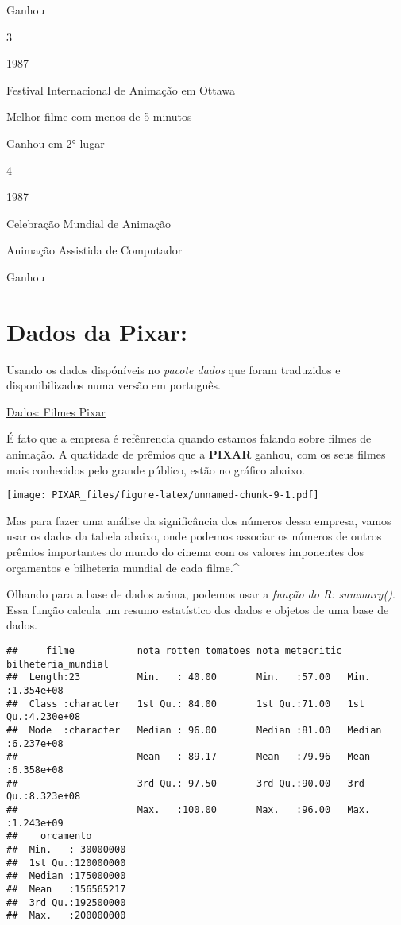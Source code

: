 \documentclass[
]{article}
\begin{document}
Ganhou

{3}

1987

Festival Internacional de Animação em Ottawa

Melhor filme com menos de 5 minutos

Ganhou em 2° lugar

{4}

1987

Celebração Mundial de Animação

Animação Assistida de Computador

Ganhou

\hypertarget{dados-da-pixar}{%
\section{\texorpdfstring{\textbf{Dados da
Pixar}:}{Dados da Pixar:}}\label{dados-da-pixar}}

Usando os dados dispóníveis no \emph{pacote dados} que foram traduzidos
e disponibilizados numa versão em português.

\href{https://cienciadedatos.github.io/dados/}{Dados: Filmes Pixar}

É fato que a empresa é refênrencia quando estamos falando sobre filmes
de animação. A quatidade de prêmios que a \textbf{PIXAR} ganhou, com os
seus filmes mais conhecidos pelo grande público, estão no gráfico
abaixo.

\texttt{[image: PIXAR\_files/figure-latex/unnamed-chunk-9-1.pdf]}

Mas para fazer uma análise da significância dos números dessa empresa,
vamos usar os dados da tabela abaixo, onde podemos associar os números
de outros prêmios importantes do mundo do cinema com os valores
imponentes dos orçamentos e bilheteria mundial de cada filme.\^{}

Olhando para a base de dados acima, podemos usar a \emph{função do R:
summary()}. Essa função calcula um resumo estatístico dos dados e
objetos de uma base de dados.

\begin{verbatim}
##     filme           nota_rotten_tomatoes nota_metacritic bilheteria_mundial 
##  Length:23          Min.   : 40.00       Min.   :57.00   Min.   :1.354e+08  
##  Class :character   1st Qu.: 84.00       1st Qu.:71.00   1st Qu.:4.230e+08  
##  Mode  :character   Median : 96.00       Median :81.00   Median :6.237e+08  
##                     Mean   : 89.17       Mean   :79.96   Mean   :6.358e+08  
##                     3rd Qu.: 97.50       3rd Qu.:90.00   3rd Qu.:8.323e+08  
##                     Max.   :100.00       Max.   :96.00   Max.   :1.243e+09  
##    orcamento        
##  Min.   : 30000000  
##  1st Qu.:120000000  
##  Median :175000000  
##  Mean   :156565217  
##  3rd Qu.:192500000  
##  Max.   :200000000
\end{verbatim}
\end{document}
